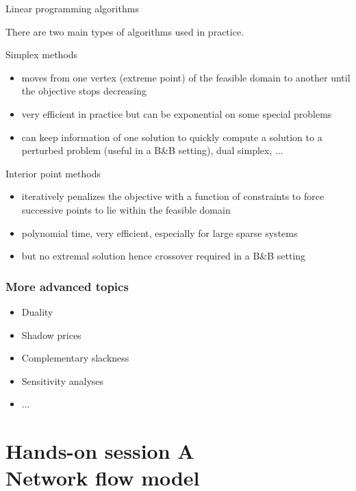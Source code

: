 \begin{frame}[allowframebreaks]{Linear programming algorithms}

There are two main types of algorithms used in practice. 

\begin{block}{Simplex methods}
\begin{itemize}
	\item moves from one vertex (extreme point) of the feasible domain to another until the objective stops decreasing
	\item very efficient in practice but can be exponential on some special problems
	\item can keep information of one solution to quickly compute a solution to a perturbed problem (useful in a B\&B setting), dual simplex, ...
	\end{itemize}
\end{block}

\begin{block}{Interior point methods}
	\begin{itemize}
	\item iteratively penalizes the objective with a function of constraints to force successive points to lie within the feasible domain
	\item polynomial time, very efficient, especially for large sparse systems
	\item but no extremal solution hence crossover required in a B\&B setting
	\end{itemize}
\end{block}
	
\end{frame}

\begin{frame} \frametitle{More advanced topics}
\begin{itemize}
	\item Duality
	\item Shadow prices
	\item Complementary slackness
	\item Sensitivity analyses
	\item ...
\end{itemize}
\end{frame}

\section[Hands-on session A: Network flow model]{Hands-on session A\\ Network flow model}

